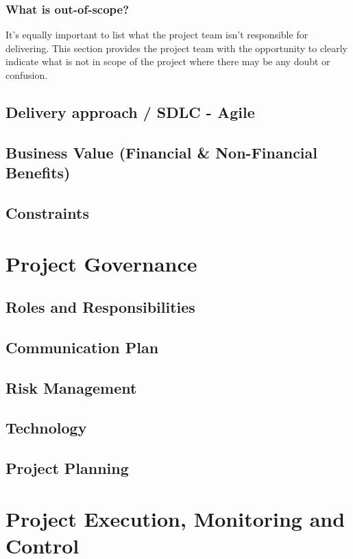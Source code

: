 \documentclass{report}
\begin{document}
\subsection{What is out-of-scope?}
It’s equally important to list what the project team isn’t responsible for delivering. This section provides the project team with the opportunity to clearly indicate what is not in scope of the project where there may be any doubt or confusion.
\section{Delivery approach / SDLC - Agile}
\section{Business Value (Financial \& Non-Financial Benefits)}
\section{Constraints}

\chapter{Project Governance}
\section{Roles and Responsibilities}
\section{Communication Plan}
\section{Risk Management}
\section{Technology}
\section{Project Planning}
\section{}

\chapter{Project Execution, Monitoring and Control}
\end{document}
